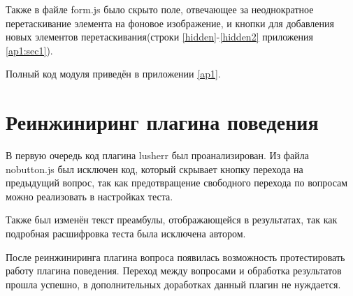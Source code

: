 Также в файле form.js было скрыто поле, отвечающее за неоднократное перетаскивание элемента на фоновое изображение, и кнопки для добавления новых элементов перетаскивания(строки \ref{hidden}-\ref{hidden2} приложения \ref{ap1:sec1}).

Полный код модуля приведён в приложении \ref{ap1}.

\section{Реинжиниринг плагина поведения} \label{ch3:sec2}

В первую очередь код плагина lusherr\cite{psy-test-lusherr} был проанализирован. Из файла nobutton.js был исключен код, который скрывает кнопку перехода на предыдущий вопрос, так как предотвращение свободного перехода по вопросам можно реализовать в настройках теста.

Также был изменён текст преамбулы, отображающейся в результатах, так как подробная расшифровка теста была исключена автором.

После реинжиниринга плагина вопроса появилась возможность протестировать работу плагина поведения. Переход между вопросами и обработка результатов прошла успешно, в дополнительных доработках данный плагин не нуждается.


